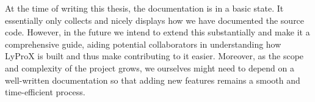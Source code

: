 \documentclass[\relativeRoot/main.tex]{subfiles}
\begin{document}
At the time of writing this thesis, the documentation is in a basic state. It essentially only collects and nicely displays how we have documented the source code. However, in the future we intend to extend this substantially and make it a comprehensive guide, aiding potential collaborators in understanding how LyProX is built and thus make contributing to it easier. Moreover, as the scope and complexity of the project grows, we ourselves might need to depend on a well-written documentation so that adding new features remains a smooth and time-efficient process.
\end{document}
